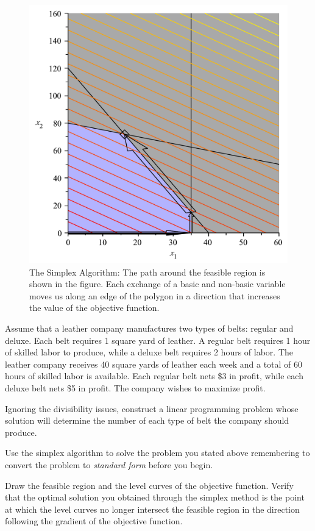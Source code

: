 \begin{example}
\begin{figure}[htbp]
\includegraphics[scale=0.35]{SimplexPath.pdf}
\caption{The Simplex Algorithm: The path around the feasible region is shown in the figure. Each exchange of a basic and non-basic variable moves us along an edge of the polygon in a direction that increases the value of the objective function.}
\label{fig:SimplexPath}
\end{figure}
\label{ex:ToyMakerSimplex}
\end{example}

\begin{exercise} Assume that a leather company manufactures two types of belts: regular and deluxe. Each belt requires 1 square yard of leather. A regular belt requires 1 hour of skilled labor to produce, while a deluxe belt requires 2 hours of labor. The leather company receives 40 square yards of leather each week and a total of 60 hours of skilled labor is available. Each regular belt nets \$3 in profit, while each deluxe belt nets \$5 in profit. The company wishes to maximize profit. 
\begin{enumerate*}
\item Ignoring the divisibility issues, construct a linear programming problem whose solution will determine the number of each type of belt the company should produce. 

\item Use the simplex algorithm to solve the problem you stated above remembering to convert the problem to \textit{standard form} before you begin. 

\item Draw the feasible region and the level curves of the objective function. Verify that the optimal solution you obtained through the simplex method is the point at which the level curves no longer intersect the feasible region in the direction following the gradient of the objective function.
\end{enumerate*}
\label{exer:Leather}
\end{exercise}

